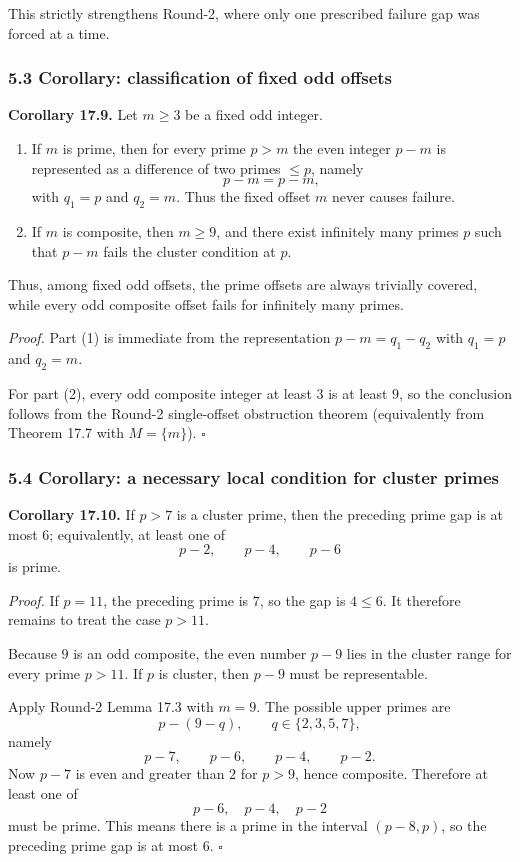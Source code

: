 This strictly strengthens Round-2, where only one prescribed failure gap was forced at a time.

\subsubsection*{5.3 Corollary: classification of fixed odd offsets}

\textbf{Corollary 17.9.}
Let $m\ge 3$ be a fixed odd integer.
\begin{enumerate}
\item If $m$ is prime, then for every prime $p>m$ the even integer $p-m$ is represented as a difference of two primes $\le p$, namely
\[
p-m=p-m,
\]
with $q_1=p$ and $q_2=m$. Thus the fixed offset $m$ never causes failure.

\item If $m$ is composite, then $m\ge 9$, and there exist infinitely many primes $p$ such that $p-m$ fails the cluster condition at $p$.
\end{enumerate}

Thus, among fixed odd offsets, the prime offsets are always trivially covered, while every odd composite offset fails for infinitely many primes.

\emph{Proof.}
Part (1) is immediate from the representation $p-m=q_1-q_2$ with $q_1=p$ and $q_2=m$.

For part (2), every odd composite integer at least $3$ is at least $9$, so the conclusion follows from the Round-2 single-offset obstruction theorem (equivalently from Theorem 17.7 with $M=\{m\}$). \hfill$\square$

\subsubsection*{5.4 Corollary: a necessary local condition for cluster primes}

\textbf{Corollary 17.10.}
If $p>7$ is a cluster prime, then the preceding prime gap is at most $6$; equivalently, at least one of
\[
p-2,\qquad p-4,\qquad p-6
\]
is prime.

\emph{Proof.}
If $p=11$, the preceding prime is $7$, so the gap is $4\le 6$. It therefore remains to treat the case $p>11$.

Because $9$ is an odd composite, the even number $p-9$ lies in the cluster range for every prime $p>11$. If $p$ is cluster, then $p-9$ must be representable.

Apply Round-2 Lemma 17.3 with $m=9$. The possible upper primes are
\[
p-(9-q),\qquad q\in\{2,3,5,7\},
\]
namely
\[
p-7,\qquad p-6,\qquad p-4,\qquad p-2.
\]
Now $p-7$ is even and greater than $2$ for $p>9$, hence composite. Therefore at least one of
\[
p-6,\quad p-4,\quad p-2
\]
must be prime. This means there is a prime in the interval $(p-8,p)$, so the preceding prime gap is at most $6$. \hfill$\square$

